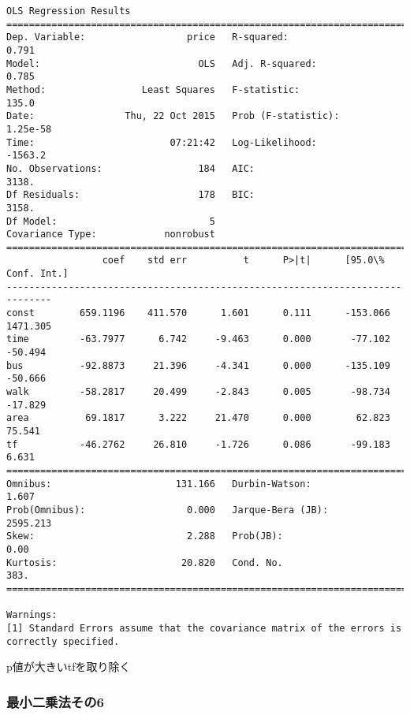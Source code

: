 \documentclass[a4paper,dvipdfmx]{jsarticle}
\begin{document}
    \begin{Verbatim}[commandchars=\\\{\}]
OLS Regression Results                            
==============================================================================
Dep. Variable:                  price   R-squared:                       0.791
Model:                            OLS   Adj. R-squared:                  0.785
Method:                 Least Squares   F-statistic:                     135.0
Date:                Thu, 22 Oct 2015   Prob (F-statistic):           1.25e-58
Time:                        07:21:42   Log-Likelihood:                -1563.2
No. Observations:                 184   AIC:                             3138.
Df Residuals:                     178   BIC:                             3158.
Df Model:                           5                                         
Covariance Type:            nonrobust                                         
==============================================================================
                 coef    std err          t      P>|t|      [95.0\% Conf. Int.]
------------------------------------------------------------------------------
const        659.1196    411.570      1.601      0.111      -153.066  1471.305
time         -63.7977      6.742     -9.463      0.000       -77.102   -50.494
bus          -92.8873     21.396     -4.341      0.000      -135.109   -50.666
walk         -58.2817     20.499     -2.843      0.005       -98.734   -17.829
area          69.1817      3.222     21.470      0.000        62.823    75.541
tf           -46.2762     26.810     -1.726      0.086       -99.183     6.631
==============================================================================
Omnibus:                      131.166   Durbin-Watson:                   1.607
Prob(Omnibus):                  0.000   Jarque-Bera (JB):             2595.213
Skew:                           2.288   Prob(JB):                         0.00
Kurtosis:                      20.820   Cond. No.                         383.
==============================================================================

Warnings:
[1] Standard Errors assume that the covariance matrix of the errors is correctly specified.
    \end{Verbatim}

    p値が大きいtfを取り除く

    \subsubsection{最小二乗法その6}\label{ux6700ux5c0fux4e8cux4e57ux6cd5ux305dux306e6}
\end{document}
